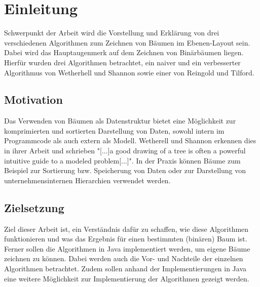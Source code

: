 \chapter{Einleitung}
\label{chap:einleitung}
Schwerpunkt der Arbeit wird die Vorstellung und Erklärung von drei verschiedenen Algorithmen zum
Zeichnen von Bäumen im Ebenen-Layout sein. Dabei wird das Hauptaugenmerk auf dem Zeichnen
von Binärbäumen liegen. Hierfür wurden drei Algorithmen betrachtet, ein naiver und ein verbesserter Algorithmus von
Wetherhell und Shannon sowie einer von Reingold und Tilford. 

\section{Motivation}
\label{sec:motivation}
Das Verwenden von Bäumen als Datenstruktur bietet eine Möglichkeit zur komprimierten und sortierten Darstellung von Daten, 
sowohl intern im Programmcode als auch extern als Modell. Wetherell und Shannon erkennen dies in ihrer Arbeit und schrieben 
"[...]a good drawing of a tree is often a powerful intuitive guide to a modeled problem[...]"\cite[]{q1}. In der Praxis können Bäume 
zum Beispiel zur Sortierung bzw. Speicherung von Daten oder zur Darstellung von unternehmensinternen Hierarchien verwendet werden. 

\section{Zielsetzung}
\label{sec:zielsetzung}
Ziel dieser Arbeit ist, ein Verständnis dafür zu schaffen, wie diese Algorithmen funktionieren
und was das Ergebnis für einen bestimmten (binären) Baum ist. Ferner sollen die
Algorithmen in Java implementiert werden, um eigene Bäume zeichnen zu können. Dabei werden auch die Vor- und Nachteile der einzelnen Algorithmen
betrachtet. Zudem sollen anhand der Implementierungen in Java
eine weitere Möglichkeit zur Implementierung der Algorithmen gezeigt werden. 
